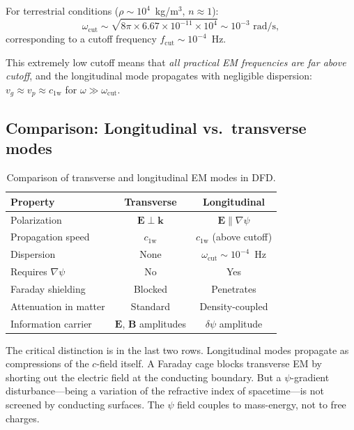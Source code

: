 \documentclass[aps,prd,twocolumn,superscriptaddress,nofootinbib,floatfix]{revtex4-2}
\newcommand{\psifield}{\psi}
\newcommand{\cfield}{c_{\text{1w}}}
\newcommand{\kvec}{\mathbf{k}}
\newcommand{\Evec}{\mathbf{E}}
\newcommand{\Bvec}{\mathbf{B}}
\newcommand{\ee}[1]{\times 10^{#1}}
\begin{document}
For terrestrial conditions ($\rho \sim 10^4$~kg/m$^3$,
$n \approx 1$):
\begin{equation}
\omega_{\text{cut}} \sim \sqrt{8\pi \times 6.67\ee{-11}
\times 10^4} \sim 10^{-3}\text{ rad/s},
\label{eq:cutoff_numerical}
\end{equation}
corresponding to a cutoff frequency
$f_{\text{cut}} \sim 10^{-4}$~Hz.

This extremely low cutoff means that \emph{all practical EM
frequencies are far above cutoff}, and the longitudinal mode
propagates with negligible dispersion:
$v_g \approx v_p \approx \cfield$ for $\omega \gg \omega_{\text{cut}}$.

\subsection{Comparison: Longitudinal vs.\ transverse modes}
\label{subsec:comparison}

\begin{table}[h]
\caption{Comparison of transverse and longitudinal EM modes in DFD.}
\label{tab:mode_comparison}
\begin{ruledtabular}
\begin{tabular}{lcc}
Property & Transverse & Longitudinal \\
\hline
Polarization & $\Evec \perp \kvec$ & $\Evec \parallel \nabla\psifield$ \\
Propagation speed & $\cfield$ & $\cfield$ (above cutoff) \\
Dispersion & None & $\omega_{\text{cut}} \sim 10^{-4}$~Hz \\
Requires $\nabla\psi$ & No & Yes \\
Faraday shielding & Blocked & Penetrates \\
Attenuation in matter & Standard & Density-coupled \\
Information carrier & $\Evec$, $\Bvec$ amplitudes & $\delta\psifield$ amplitude \\
\end{tabular}
\end{ruledtabular}
\end{table}

The critical distinction is in the last two rows. Longitudinal modes
propagate as compressions of the $c$-field itself. A Faraday cage
blocks transverse EM by shorting out the electric field at the
conducting boundary. But a $\psifield$-gradient disturbance---being
a variation of the refractive index of spacetime---is not screened
by conducting surfaces. The $\psifield$ field couples to mass-energy,
not to free charges.
\end{document}
